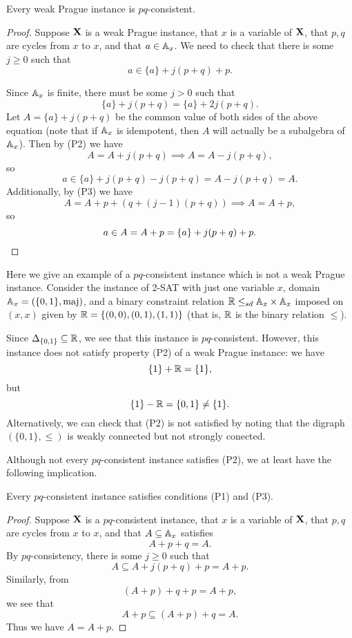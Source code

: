 \documentclass[letterpaper,11pt]{article}
\DeclareMathOperator{\maj}{maj}
\begin{document}
\begin{thm}\label{weak-prague-pq} Every weak Prague instance is $pq$-consistent.
\end{thm}
\begin{proof} Suppose $\mathbf{X}$ is a weak Prague instance, that $x$ is a variable of $\mathbf{X}$, that $p,q$ are cycles from $x$ to $x$, and that $a \in \mathbb{A}_x$. We need to check that there is some $j \ge 0$ such that
\[
a \in \{a\} + j(p+q) + p.
\]

Since $\mathbb{A}_x$ is finite, there must be some $j > 0$ such that
\[
\{a\} + j(p+q) = \{a\} + 2j(p+q).
\]
Let $A = \{a\} + j(p+q)$ be the common value of both sides of the above equation (note that if $\mathbb{A}_x$ is idempotent, then $A$ will actually be a subalgebra of $\mathbb{A}_x$). Then by (P2) we have
\[
A = A + j(p+q) \implies A = A - j(p+q),
\]
so
\[
a \in \{a\} + j(p+q) - j(p+q) = A - j(p+q) = A.
\]
Additionally, by (P3) we have
\[
A = A + p + (q + (j-1)(p+q)) \implies A = A + p,
\]
so
\[
a \in A = A + p = \{a\} + j(p+q) + p.\qedhere
\]
\end{proof}

\begin{ex} Here we give an example of a $pq$-consistent instance which is not a weak Prague instance. Consider the instance of 2-SAT with just one variable $x$, domain $\bA_x = (\{0,1\}, \maj)$, and a binary constraint relation $\mathbb{R} \le_{sd} \mathbb{A}_x\times \mathbb{A}_x$ imposed on $(x,x)$ given by $\mathbb{R} = \{(0,0),(0,1),(1,1)\}$ (that is, $\mathbb{R}$ is the binary relation $\le$).

Since $\Delta_{\{0,1\}} \subseteq \mathbb{R}$, we see that this instance is $pq$-consistent. However, this instance does not satisfy property (P2) of a weak Prague instance: we have
\[
\{1\} + \mathbb{R} = \{1\},
\]
but
\[
\{1\} - \mathbb{R} = \{0,1\} \ne \{1\}.
\]
Alternatively, we can check that (P2) is not satisfied by noting that the digraph $(\{0,1\},\le)$ is weakly connected but not strongly conected.
\end{ex}

Although not every $pq$-consistent instance satisfies (P2), we at least have the following implication.

\begin{thm}\label{pq-p1-p3} Every $pq$-consistent instance satisfies conditions (P1) and (P3).
\end{thm}
\begin{proof} Suppose $\mathbf{X}$ is a $pq$-consistent instance, that $x$ is a variable of $\mathbf{X}$, that $p,q$ are cycles from $x$ to $x$, and that $A \subseteq \mathbb{A}_x$ satisfies
\[
A + p + q = A.
\]
By $pq$-consistency, there is some $j \ge 0$ such that
\[
A \subseteq A + j(p+q) + p = A + p.
\]
Similarly, from
\[
(A+p) + q+p = A+p,
\]
we see that
\[
A+p \subseteq (A+p) + q = A.
\]
Thus we have $A = A+p$.
\end{proof}
\end{document}
